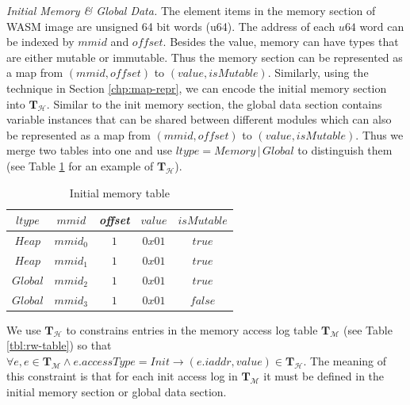 \noindent\emph{Initial Memory \& Global Data.}
The element items in the memory section of WASM image are unsigned 64 bit words (u64). The address of each $u64$ word can be indexed by $mmid$ and $offset$. Besides the value, memory can have types that are either mutable or immutable. Thus the memory section can be represented as a map from $(mmid, offset)$ to $(value, isMutable)$. Similarly, using the technique in Section \ref{chp:map-repr}, we can encode the initial memory section into $\mathbf{T}_\mathcal{H}$. Similar to the init memory section, the global data section contains variable instances that can be shared between different modules which can also be represented as a map from $(mmid, offset)$ to $(value, isMutable)$. Thus we merge two tables into one and use $ltype = Memory \,|\, Global$ to distinguish them (see Table \ref{tbl:init-memory-table} for an example of $\mathbf{T}_{\mathcal{H}}$).
\begin{table}[!h]
\begin{center}
\caption{Initial memory table}
\label{tbl:init-memory-table}
\begin{tabular}{ | c | c | c | c | c | }
  \hline
  $ltype$ & $mmid$ & \emph{offset} & $value$ & $isMutable$ \\
  \hline
  $Heap$ & $mmid_0$ & $1$ & $0x01$ & $true$ \\
  \hline
  $Heap$ & $mmid_1$ & $1$ & $0x01$ & $true$ \\
  \hline
  $Global$ & $mmid_2$ & $1$ & $0x01$ & $true$ \\ 
  \hline
  $Global$ & $mmid_3$ & $1$ & $0x01$ & $false$ \\ 
  \hline
\end{tabular}

\end{center}
\end{table}

We use $\mathbf{T}_\mathcal{H}$ to constrains entries in the memory access log table $\mathbf{T}_\mathcal{M}$ (see Table \ref{tbl:rw-table}) so that $\forall e, e\in \mathbf{T}_\mathcal{M} \wedge e.accessType = Init \rightarrow (e.iaddr, value) \in \mathbf{T}_\mathcal{H}$. The meaning of this constraint is that for each init access log in $\mathbf{T}_\mathcal{M}$ it must be defined in the initial memory section or global data section.


